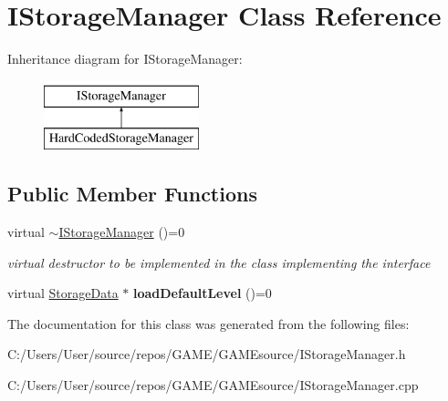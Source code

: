 \hypertarget{class_i_storage_manager}{}\section{I\+Storage\+Manager Class Reference}
\label{class_i_storage_manager}
Inheritance diagram for I\+Storage\+Manager\+:\begin{figure}[H]
\begin{center}
\leavevmode
\includegraphics[height=2.000000cm]{class_i_storage_manager}
\end{center}
\end{figure}
\subsection*{Public Member Functions}
\begin{DoxyCompactItemize}
\item 
\mbox{\label{class_i_storage_manager_a5e3d6fa4a26ce40e4a23a13138a2c055}} 
virtual \mbox{\hyperlink{class_i_storage_manager_a5e3d6fa4a26ce40e4a23a13138a2c055}{$\sim$\+I\+Storage\+Manager}} ()=0
\begin{DoxyCompactList}\small\item\em virtual destructor to be implemented in the class implementing the interface \end{DoxyCompactList}\item 
\mbox{\label{class_i_storage_manager_a8b8e56ec32e4780a5fda9fa26e18a70c}} 
virtual \mbox{\hyperlink{class_storage_data}{Storage\+Data}} $\ast$ {\bfseries load\+Default\+Level} ()=0
\end{DoxyCompactItemize}


The documentation for this class was generated from the following files\+:\begin{DoxyCompactItemize}
\item 
C\+:/\+Users/\+User/source/repos/\+G\+A\+M\+E/\+G\+A\+M\+Esource/I\+Storage\+Manager.\+h\item 
C\+:/\+Users/\+User/source/repos/\+G\+A\+M\+E/\+G\+A\+M\+Esource/I\+Storage\+Manager.\+cpp\end{DoxyCompactItemize}
